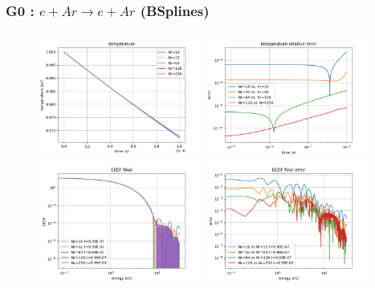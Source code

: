 \documentclass[mathserif, aspectratio=169]{beamer}
\begin{document}
	\begin{frame}
		\frametitle{G0 : $e + Ar \rightarrow e + Ar$ (BSplines)}
		\begin{figure}
			\only<+>
			{
				\includegraphics[width=0.48\textwidth]{g0_bs_temp.png}
				\includegraphics[width=0.48\textwidth]{g0_bs_temp_error.png}
			}
			\only<+>
			{
				\includegraphics[width=0.48\textwidth]{g0_bs_eedf_final.png}
				\includegraphics[width=0.48\textwidth]{g0_bs_eedf_final_error.png}
			}
		\end{figure}
	\end{frame}
\end{document}
